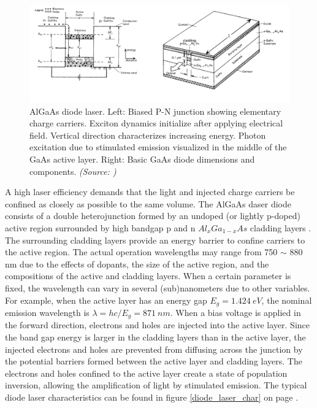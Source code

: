 \begin{figure} [ht]
\centering
\includegraphics[scale=0.5]{chapters/img/laser_diode_algaas.png}	
\caption{AlGaAs diode laser. Left: Biased P-N junction showing elementary charge carriers. Exciton dynamics initialize after applying electrical field. Vertical direction characterizes increasing energy. Photon excitation due to stimulated emission visualized in the middle of the GaAs active layer. Right: Basic GaAs diode dimensions and components. \emph{(Source: \cite{algaasdiodes})}}
\label{algaas_laser_configuration} 
\end{figure}

A high laser efficiency demands that the light and injected charge carriers be confined as closely as possible to the same volume. The AlGaAs daser diode consists of a double heterojunction formed by an undoped (or lightly p-doped) active region surrounded by high bandgap p and n $Al_{x}Ga_{1-x}As$ cladding layers \cite{algaasdiodes}. The surrounding cladding layers provide an energy barrier to confine carriers to the active region. The actual operation wavelengths may range from 750 $\sim$ 880 nm due to the effects of dopants, the size of the active region, and the compositions of the active and cladding layers. When a certain parameter is fixed, the wavelength can vary in several (sub)nanometers due to other variables. For example, when the active layer has an energy gap $E_{g} = 1.424\ eV$, the nominal emission wavelength is $\lambda = hc/E_{g}= 871\ nm$. When a bias voltage is applied in the forward direction, electrons and holes are injected into the active layer. Since the band gap energy is larger in the cladding layers than in the active layer, the injected electrons and holes are prevented from diffusing across the junction by the potential barriers formed between the active layer and cladding layers. The electrons and holes confined to the active layer create a state of population inversion, allowing the amplification of light by stimulated emission. The typical diode laser characteristics can be found in figure \ref{diode_laser_char} on page \pageref{diode_laser_char}.

